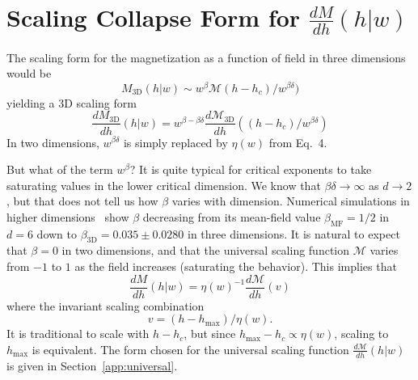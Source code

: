 \documentclass[reprint,amsmath,amssymb,aps,floatfix]{revtex4-1}
\begin{document}
\section{\label{app:magscale} Scaling Collapse Form for $\frac{dM}{dh}(h|w)$}
The scaling form for the magnetization as a function of field in three dimensions would be 
%
\begin{equation}
	M_{\textrm{3D}}(h|w) \sim w^\beta \mathcal{M}(h-h_c)/w^{\beta\delta})
\end{equation}
%
\noindent yielding a 3D scaling form 
%
\begin{equation}
	\frac{dM_{\textrm{3D}}}{dh}(h|w) =w^{\beta-\beta\delta} \frac{d\mathcal{M}_{\textrm{3D}}}{dh}((h-h_c)/w^{\beta\delta})
\end{equation}
%
\noindent In two dimensions, $w^{\beta\delta}$ is simply replaced by $\eta(w)$ from Eq.~4.\par
%
But what of the term $w^\beta$? It is quite typical for critical exponents to take saturating values in the lower critical dimension. We know that $\beta\delta \to \infty$ as $d\to 2$, but that does not tell us how $\beta$ varies with dimension. Numerical simulations in higher dimensions~\cite{Perkovic96} show $\beta$ decreasing from its mean-field value $\beta_{\textrm{MF}}=1/2$ in $d=6$ down to $\beta_{\textrm{3D}} = 0.035 \pm 0.0280$ in three dimensions. It is natural to expect that $\beta = 0$ in two dimensions, and that the universal scaling function $\mathcal{M}$ varies from $-1$ to $1$ as the field increases (saturating the behavior). This implies that
%
\begin{equation}
	\frac{dM}{dh}(h|w)=\eta(w)^{-1}\frac{d\mathcal{M}}{dh}(v)
\end{equation}
%
\noindent where the invariant scaling combination
%
\begin{equation}
	v = (h-h_{\textrm{max}})/\eta(w).
\end{equation}
%
\noindent It is traditional to scale with $h-h_c$, but since $h_{\textrm{max}}-h_c\propto \eta(w)$, scaling to $h_{\textrm{max}}$ is equivalent. The form chosen for the universal scaling function $\frac{d\mathcal{M}}{dh}(h|w)$ is given in Section~\ref{app:universal}.
\end{document}
